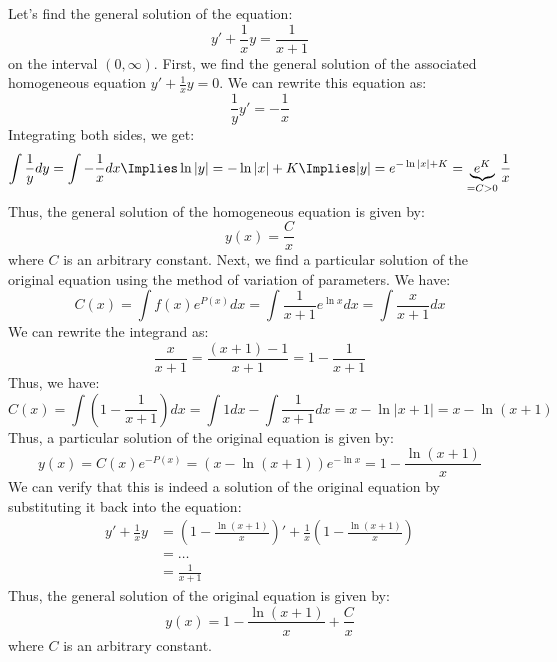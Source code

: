 \begin{eg}
    Let's find the general solution of the equation:
    \[
        y' + \frac{1}{x} y = \frac{1}{x + 1}
    \]
    on the interval $(0, \infty)$. First, we find the general solution of the associated homogeneous equation $y' + \frac{1}{x} y = 0$. We can rewrite this equation as:
    \[
        \frac{1}{y} y' = -\frac{1}{x}
    \]
    Integrating both sides, we get:
    \[
        \int \frac{1}{y} dy = \int -\frac{1}{x} dx \Implies \ln |y| = -\ln |x| + K \Implies |y| = e^{- \ln |x| + K} = \underbrace{e^K}_{= C > 0} \frac{1}{x}
    \]
    Thus, the general solution of the homogeneous equation is given by:
    \[
        y(x) = \frac{C}{x}
    \]
    where $C$ is an arbitrary constant. Next, we find a particular solution of the original equation using the method of variation of parameters. We have:
    \[
        C(x) = \int f(x) e^{P(x)} dx = \int \frac{1}{x + 1} e^{\ln x} dx = \int \frac{x}{x + 1} dx
    \]
    We can rewrite the integrand as:
    \[
        \frac{x}{x + 1} = \frac{(x + 1) - 1}{x + 1} = 1 - \frac{1}{x + 1}
    \]
    Thus, we have:
    \[
        C(x) = \int \left(1 - \frac{1}{x + 1}\right) dx = \int 1 dx - \int \frac{1}{x + 1} dx = x - \ln |x + 1| = x - \ln (x + 1)
    \]
    Thus, a particular solution of the original equation is given by:
    \[
        y(x) = C(x) e^{-P(x)} = (x - \ln (x + 1)) e^{-\ln x} = 1 - \frac{\ln (x + 1)}{x}
    \]
    We can verify that this is indeed a solution of the original equation by substituting it back into the equation:
    \begin{align*}
        y' + \frac{1}{x} y & = \left(1 - \frac{\ln (x + 1)}{x}\right)' + \frac{1}{x} \left(1 - \frac{\ln (x + 1)}{x}\right) \\
        & = \ldots \\
        & = \frac{1}{x + 1}
    \end{align*}
    Thus, the general solution of the original equation is given by:
    \[
        y(x) = 1 - \frac{\ln (x + 1)}{x} + \frac{C}{x}
    \]
    where $C$ is an arbitrary constant.
\end{eg}

